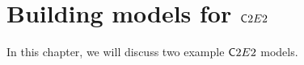 \documentclass{tufte-book} %
\begin{document}






\chapter{Building models for ${{\mathsf C2E2}}$}
\label{sec:plots}
In this chapter, we will discuss two example ${{\mathsf C2E2}}$ models. 
\end{document}
